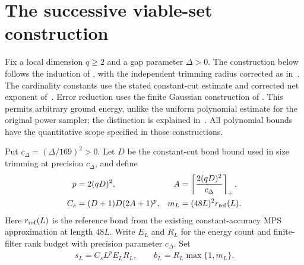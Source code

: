\section{The successive viable-set construction}
\label{sec:lvv_successive_construction}

Fix a local dimension $q\ge2$ and a gap parameter $\Delta>0$.
The construction below follows the induction of \cite{Landau2015Polynomial},
with the independent trimming radius corrected as
in~\cite{gap:lvv13_trimming_radius}. The cardinality constants use the
stated constant-cut estimate and corrected net exponent
of~\cite{gap:lvv13_constant_bond}. Error reduction uses the finite Gaussian
construction of \cite[Section~5.4, Lemmas~18--19]{Huang2015GroundState}.
This permits arbitrary ground energy, unlike the uniform polynomial
estimate for the original power sampler; the distinction is explained
in~\cite{gap:lvv13_runtime_ground_energy}.
All polynomial bounds have the quantitative scope specified in those constructions.

\begin{definition}
    \label{def:lvv_successive_budgets}
    \leanok
    Put $c_\Delta=(\Delta/169)^2>0$. Let $D$ be the constant-cut bond bound
    used in size trimming at precision $c_\Delta$, and define
    \begin{align}
        p   & =2(qD)^2,                                           &
        A   & =\left\lceil\frac{2(qD)^2}{c_\Delta}\right\rceil_+,   \\
        C_s & =(D+1)D(2A+1)^p,                                    &
        m_L & =(48L)^2r_{\rm ref}(L).
    \end{align}
    Here $r_{\rm ref}(L)$ is the reference bond from the existing constant-accuracy
    MPS approximation at length $48L$. Write $E_L$ and $R_L$ for the energy count
    and finite-filter rank budget with precision parameter $c_\Delta$. Set
    \begin{align}
        s_L=C_sL^pE_LR_L,\qquad b_L=R_L\max\{1,m_L\}.
    \end{align}
\end{definition}

